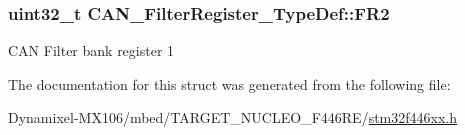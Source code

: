 \subsubsection[{\texorpdfstring{F\+R2}{FR2}}]{ uint32\+\_\+t C\+A\+N\+\_\+\+Filter\+Register\+\_\+\+Type\+Def\+::\+F\+R2}\hypertarget{struct_c_a_n___filter_register___type_def_a77959e28a302b05829f6a1463be7f800}{}\label{struct_c_a_n___filter_register___type_def_a77959e28a302b05829f6a1463be7f800}
C\+AN Filter bank register 1 

The documentation for this struct was generated from the following file\+:\begin{DoxyCompactItemize}
\item 
Dynamixel-\/\+M\+X106/mbed/\+T\+A\+R\+G\+E\+T\+\_\+\+N\+U\+C\+L\+E\+O\+\_\+\+F446\+R\+E/\hyperlink{stm32f446xx_8h}{stm32f446xx.\+h}\end{DoxyCompactItemize}
